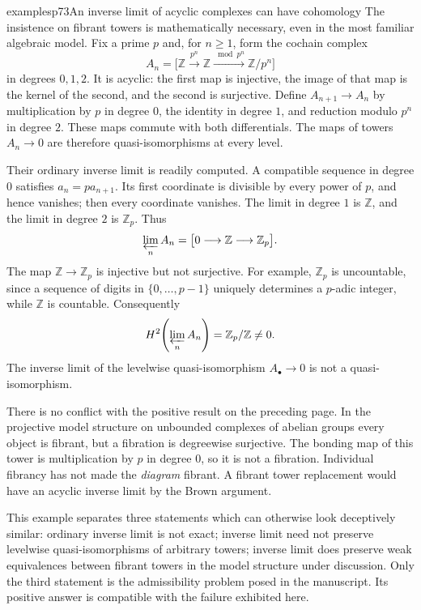 \begin{dcomment}{examples}{p73}{An inverse limit of acyclic complexes can have cohomology}
The insistence on fibrant towers is mathematically necessary, even in the most familiar algebraic model. Fix a prime $p$ and, for $n\geq1$, form the cochain complex
\[
 A_n=\bigl[\mathbb Z\xrightarrow{p^n}\mathbb Z
                   \xrightarrow{\bmod p^n}\mathbb Z/p^n\bigr]
\]
in degrees $0,1,2$. It is acyclic: the first map is injective, the image of that map is the kernel of the second, and the second is surjective. Define $A_{n+1}\to A_n$ by multiplication by $p$ in degree $0$, the identity in degree $1$, and reduction modulo $p^n$ in degree $2$. These maps commute with both differentials. The maps of towers $A_n\to0$ are therefore quasi-isomorphisms at every level.

Their ordinary inverse limit is readily computed. A compatible sequence in degree $0$ satisfies $a_n=p a_{n+1}$. Its first coordinate is divisible by every power of $p$, and hence vanishes; then every coordinate vanishes. The limit in degree $1$ is $\mathbb Z$, and the limit in degree $2$ is $\mathbb Z_p$. Thus
\[
               \varprojlim_n A_n=\bigl[0\longrightarrow\mathbb Z
                                          \longrightarrow\mathbb Z_p\bigr].
\]
The map $\mathbb Z\to\mathbb Z_p$ is injective but not surjective. For example, $\mathbb Z_p$ is uncountable, since a sequence of digits in $\{0,\ldots,p-1\}$ uniquely determines a $p$-adic integer, while $\mathbb Z$ is countable. Consequently
\[
              H^2\!\left(\varprojlim_n A_n\right)=\mathbb Z_p/\mathbb Z\ne0.
\]
The inverse limit of the levelwise quasi-isomorphism $A_\bullet\to0$ is not a quasi-isomorphism.

There is no conflict with the positive result on the preceding page. In the projective model structure on unbounded complexes of abelian groups every object is fibrant, but a fibration is degreewise surjective. The bonding map of this tower is multiplication by $p$ in degree $0$, so it is not a fibration. Individual fibrancy has not made the \emph{diagram} fibrant. A fibrant tower replacement would have an acyclic inverse limit by the Brown argument.

This example separates three statements which can otherwise look deceptively similar: ordinary inverse limit is not exact; inverse limit need not preserve levelwise quasi-isomorphisms of arbitrary towers; inverse limit does preserve weak equivalences between fibrant towers in the model structure under discussion. Only the third statement is the admissibility problem posed in the manuscript. Its positive answer is compatible with the failure exhibited here.
\end{dcomment}

